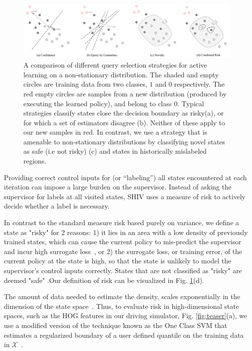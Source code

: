 \documentclass[10pt, conference]{ieeeconf}      %
\newcommand{\fpnote}[1]{\ifthenelse{ \boolean{include-notes}}%
 {\textcolor{blue}{\textbf{FP: #1}}}{}}
\begin{document}
\begin{figure}[t]
\centering

\includegraphics[width=\textwidth]{figures/active_learning.pdf}

\caption{\footnotesize A comparison of different query selection strategies for active learning on a non-stationary distribution. The shaded and empty circles are training data from two classes, $1$ and $0$ respectively. The red empty circles are samples from a new distribution (produced by executing the learned policy), and belong to class $0$. Typical strategies classify states close the decision boundary as risky(a), or for which a set of estimators disagree (b). Neither of these apply to our new samples in red. In contrast, we use a strategy that is amenable to non-stationary distributions by classifying  novel states as safe (i.e not risky) (c) and states in historically mislabeled regions. }
\vspace*{-20pt}
\label{fig:support_example}
\end{figure}



Providing correct control inputs for (or ``labeling'')  all states encountered at each
iteration can impose a large burden on the supervisor.
Instead of asking the supervisor for labels at all visited states, SHIV uses a measure of risk to actively decide whether a label is necessary. 

In contrast to the standard measure risk based purely on variance, we define a state as "risky" for 2 reasons: 1) it lies in an area with a low density of
previously trained states, which can cause the current policy to mis-predict the supervisor and incur high surrogate
loss~\cite{tokdar2010importance}, or 2) the surrogate loss, or training error, of the current policy at the state  is high, so that the state is unlikely to model the supervisor's control inputs correctly. States that are not classified as "risky" are deemed "safe" .Our definition of risk can be visualized in Fig. \ref{fig:support_example}(d).  

The amount of data needed to estimate the density, scales exponentially in the dimension of the state space~\cite{nadaraya1964estimating}. 
Thus, to evaluate risk in high-dimensional state spaces, such as the HOG features in our driving simulator, Fig. \ref{fig:teaser}(a), we use
a modified version of the technique known as the One Class SVM that  estimates a regularized boundary of a user defined quantile on the training data in $\mathcal{X}$~\cite{scholkopf2001estimating}.
\end{document}

